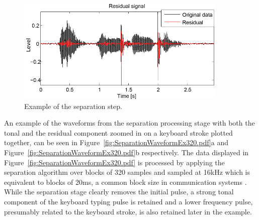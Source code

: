 \begin{figure}
\begin{minipage}[b]{1.0\linewidth}
  \centering
  \centerline{\includegraphics[width=10cm]{Separation_Residual_Example}}
\end{minipage}
\caption{Example of the separation step.}
\label{fig:Separation_Residual_Example}
\end{figure}

An example of the waveforms from the separation processing stage with both the tonal and the residual component zoomed in on a keyboard stroke plotted together, can be seen in Figure~\ref{fig:SeparationWaveformEx320.pdf}a and Figure~\ref{fig:SeparationWaveformEx320.pdf}b respectively. The data displayed in Figure~\ref{fig:SeparationWaveformEx320.pdf} is processed by applying the separation algorithm over blocks of 320 samples and sampled at 16kHz which is equivalent to blocks of 20ms, a common block size in communication systems \cite{Subramanya2007}. While the separation stage clearly removes the initial pulse, a strong tonal component of the keyboard typing pulse is retained and a lower frequency pulse, presumably related to the keyboard stroke, is also retained later in the example.

